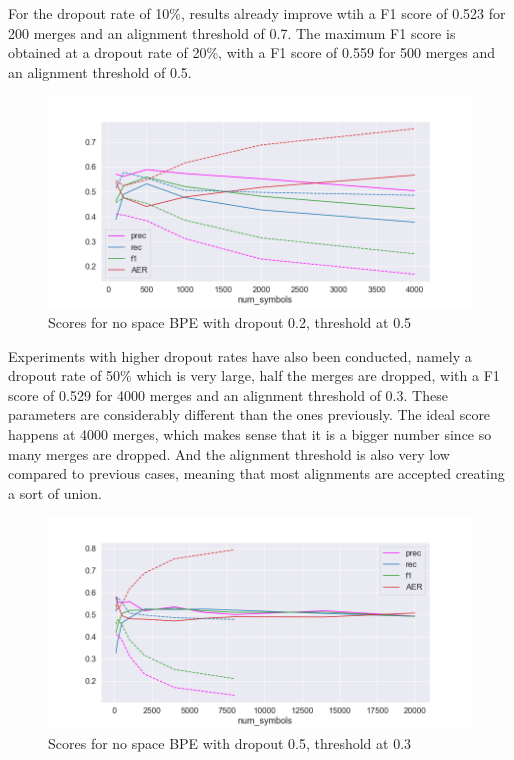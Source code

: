 For the dropout rate of 10\%, results already improve wtih a F1 score of 0.523 for 200 merges and an alignment threshold of 0.7. The maximum F1 score is obtained at a dropout rate of 20\%, with a F1 score of 0.559 for 500 merges and an alignment threshold of 0.5.

\begin{figure}[!ht]
    \centering
    \includegraphics[width=11.5cm]{../reports/scores_dropout_bpe/no space/0.2/scores_ns_0.5_thres.png}
    \caption{Scores for no space BPE with dropout 0.2, threshold at 0.5}
\end{figure}

Experiments with higher dropout rates have also been conducted, namely a dropout rate of 50\% which is very large, half the merges are dropped, with a F1 score of 0.529 for 4000 merges and an alignment threshold of 0.3. These parameters are considerably different than the ones previously. The ideal score happens at 4000 merges, which makes sense that it is a bigger number since so many merges are dropped. And the alignment threshold is also very low compared to previous cases, meaning that most alignments are accepted creating a sort of union.

\begin{figure}[!ht]
    \centering
    \includegraphics[width=11.5cm]{../reports/scores_dropout_bpe/no space/0.5/scores_ns_0.3_thres.png}
    \caption{Scores for no space BPE with dropout 0.5, threshold at 0.3}
\end{figure}
